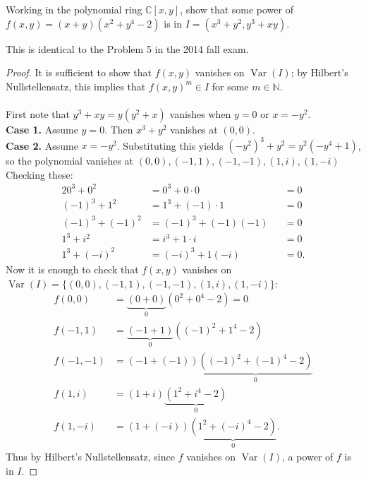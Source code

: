 \documentclass{article}
\newenvironment{problem}[2][Problem]{\begin{trivlist}
\item[\hskip \labelsep {\bfseries #1}\hskip \labelsep {\bfseries #2.}]}{\end{trivlist}}
\newenvironment{note}[1][Note.]{\begin{trivlist}
\item[\hskip \labelsep {\bfseries #1}]}{\end{trivlist}}
\newcommand{\C}{\mathbb C}
\newcommand{\N}{\mathbb N}
\newcommand{\set}[1]{\{#1\}}
\newcommand{\Var}{\operatorname{Var}}
\begin{document}
\begin{problem}{3}
  Working in the polynomial ring $\C[x, y]$, show that some power of
  $f(x,y) = (x + y)(x^2 + y^4 -2)$ is in $I = (x^3 + y^2, y^3 + xy)$.
\end{problem}
\begin{note}
  This is identical to the Problem 5 in the 2014 fall exam.
\end{note}
\begin{proof}
  It is sufficient to show that $f(x,y)$ vanishes on $\Var(I)$; by
  Hilbert's Nullstellensatz,
  this implies that $f(x,y)^m \in I$ for some $m \in \N$.
  \\~\\
  First note that $y^3 + xy = y(y^2 + x)$ vanishes when $y = 0$ or $x = -y^2$.
  \\
  \textbf{Case 1.} Assume $y = 0$. Then $x^3 + y^2$ vanishes at $(0, 0)$.
  \\
  \textbf{Case 2.} Assume $x = -y^2$. Substituting this yields
  $(-y^2)^3 + y^2 = y^2(-y^4 + 1)$, so the polynomial vanishes at
  $(0,0),(-1,1), (-1,-1),(1,i),(1,-i)$
  Checking these: \begin{alignat*}{2}
    0^3 + 0^2 &= 0^3 + 0 \cdot 0 &&= 0 \\
    (-1)^3 + 1^2 &= 1^3 + (-1) \cdot 1 &&= 0 \\
    (-1)^3 + (-1)^2 &= (-1)^3 + (-1)(-1) &&= 0 \\
    1^3 + i^2 &= i^3 + 1 \cdot i &&= 0 \\
    1^3 + (-i)^2 &= (-i)^3 + 1(-i) &&= 0.
  \end{alignat*}
  Now it is enough to check that $f(x,y)$ vanishes on
  $\Var(I) = \set{(0,0),(-1,1), (-1,-1),(1,i),(1,-i)}$: \begin{align*}
    f(0, 0) &= \underbrace{(0 + 0)}_0(0^2 + 0^4 - 2) = 0\\
    f(-1, 1) &= \underbrace{(-1 + 1)}_0((-1)^2 + 1^4 - 2) \\
    f(-1, -1) &= (-1 + (-1))\underbrace{((-1)^2 + (-1)^4 - 2)}_0 \\
    f(1, i) &= (1 + i)\underbrace{(1^2 + i^4 - 2)}_0 \\
    f(1, -i) &= (1 + (-i))\underbrace{(1^2 + (-i)^4 - 2)}_0.
  \end{align*}
  Thus by Hilbert's Nullstellensatz, since $f$ vanishes on $\Var(I)$, a power of
  $f$ is in $I$.
\end{proof}
\pagebreak
\end{document}
